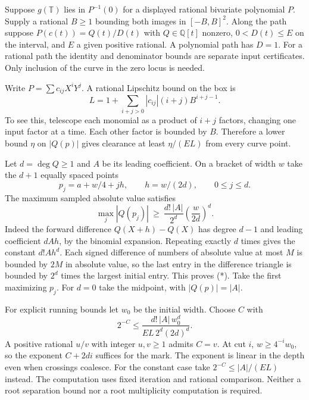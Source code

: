 Suppose $g(\mathbb T)$ lies in $P^{-1}(0)$ for a displayed rational
bivariate polynomial $P$. Supply a rational $B\ge1$ bounding both images
in $[-B,B]^2$. Along the path suppose $P(c(t))=Q(t)/D(t)$ with
$Q\in\mathbb Q[t]$ nonzero, $0<D(t)\le E$ on the interval, and $E$
a given positive rational. A polynomial path has $D=1$. For a rational
path the identity and denominator bounds are separate input certificates.
Only inclusion of the curve in the zero locus is needed.

Write $P=\sum c_{ij}X^iY^j$. A rational Lipschitz bound on the box is
\[
 L=1+\sum_{i+j>0}|c_{ij}|(i+j)B^{i+j-1}.
\]
To see this, telescope each monomial as a product of $i+j$ factors, changing
one input factor at a time. Each other factor is bounded by $B$. Therefore
a lower bound $\eta$ on $|Q(p)|$ gives clearance at least $\eta/(EL)$
from every curve point.

Let $d=\deg Q\ge1$ and $A$ be its leading coefficient. On a bracket
of width $w$ take the $d+1$ equally spaced points
\[
 p_j=a+w/4+jh,\qquad h=w/(2d),\qquad 0\le j\le d .
\]
The maximum sampled absolute value satisfies
\[
 \max_j |Q(p_j)|\ \ge\ \frac{d!\,|A|}{2^d}
                \left(\frac{w}{2d}\right)^d.                \tag{*}
\]
Indeed the forward difference $Q(X+h)-Q(X)$ has degree $d-1$ and
leading coefficient $dAh$, by the binomial expansion. Repeating exactly
$d$ times gives the constant $d!Ah^d$. Each signed difference of numbers of
absolute value at most $M$ is bounded by $2M$ in absolute value, so the last
entry in the difference triangle is bounded by $2^d$ times the largest
initial entry. This proves (*). Take the first maximizing $p_j$. For $d=0$
take the midpoint, with $|Q(p)|=|A|$.

For explicit running bounds let $w_0$ be the initial width. Choose $C$ with
\[
 2^{-C}\le \frac{d!\,|A|\, w_0^d}{EL\,2^d(2d)^d}.
\]
A positive rational $u/v$ with integer $u,v\ge1$ admits $C=v$.
At cut $i$, $w\ge 4^{-i}w_0$, so the exponent $C+2di$ suffices for the
mark. The exponent is linear in the depth even when crossings coalesce.
For the constant case take $2^{-C}\le |A|/(EL)$ instead.
The computation uses fixed iteration and rational comparison. Neither a
root separation bound nor a root multiplicity computation is required.

